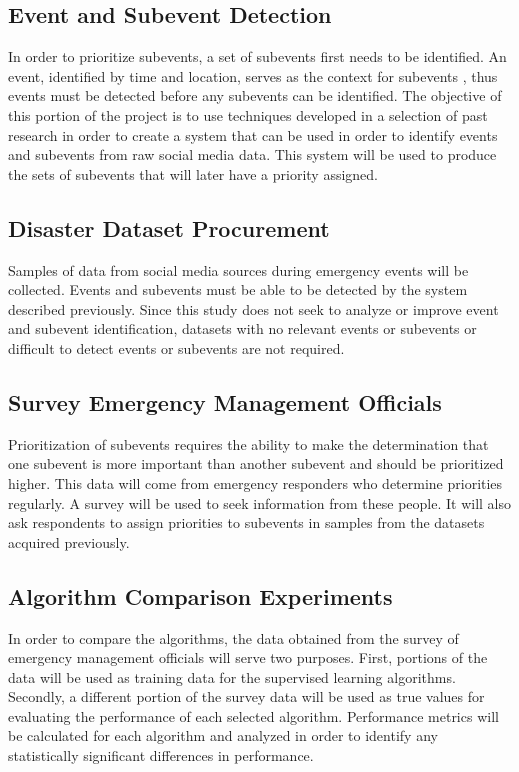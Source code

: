 \documentclass[conference]{IEEEtran}
\begin{document}
\subsection{Event and Subevent Detection}
In order to prioritize subevents, a set of subevents first needs to be identified. An event, identified by time and location, serves as the context for subevents \cite{Pohl}, thus events must be detected before any subevents can be identified. The objective of this portion of the project is to use techniques developed in a selection of past research in order to create a system that can be used in order to identify events and subevents from raw social media data. This system will be used to produce the sets of subevents that will later have a priority assigned.
\subsection{Disaster Dataset Procurement}
Samples of data from social media sources during emergency events will be collected. Events and subevents must be able to be detected by the system described previously. Since this study does not seek to analyze or improve event and subevent identification, datasets with no relevant events or subevents or difficult to detect events or subevents are not required.
\subsection{Survey Emergency Management Officials}
Prioritization of subevents requires the ability to make the determination that one subevent is more important than another subevent and should be prioritized higher. This data will come from emergency responders who determine priorities regularly. A survey will be used to seek information from these people. It will also ask respondents to assign priorities to subevents in samples from the datasets acquired previously.
\subsection{Algorithm Comparison Experiments}
In order to compare the algorithms, the data obtained from the survey of emergency management officials will serve two purposes. First, portions of the data will be used as training data for the supervised learning algorithms. Secondly, a different portion of the survey data will be used as true values for evaluating the performance of each selected algorithm. Performance metrics will be calculated for each algorithm and analyzed in order to identify any statistically significant differences in performance.
\end{document}
